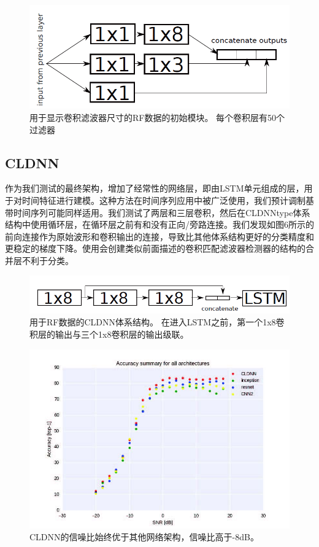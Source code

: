\begin{figure}[!h]
	\centering
	\includegraphics[scale=1]{figures/chapter_5/fig5}
	\caption{用于显示卷积滤波器尺寸的RF数据的初始模块。 每个卷积层有50个过滤器}
\end{figure}

\subsection{CLDNN}

作为我们测试的最终架构，增加了经常性的网络层，即由LSTM单元组成的层，用于对时间特征进行建模。这种方法在时间序列应用中被广泛使用，我们预计调制基带时间序列可能同样适用。我们测试了两层和三层卷积，然后在CLDNNtype体系结构中使用循环层，在循环层之前有和没有正向/旁路连接。我们发现如图6所示的前向连接作为原始波形和卷积输出的连接，导致比其他体系结构更好的分类精度和更稳定的梯度下降。使用会创建类似前面描述的卷积匹配滤波器检测器的结构的合并层不利于分类。\par
\begin{figure}[!h]
	\centering
	\includegraphics[scale=1]{figures/chapter_5/fig6}
	\caption{用于RF数据的CLDNN体系结构。 在进入LSTM之前，第一个1x8卷积层的输出与三个1x8卷积层的输出级联。}
\end{figure}

\begin{figure}[!h]
	\centering
	\includegraphics[scale=1]{figures/chapter_5/fig7}
	\caption{CLDNN的信噪比始终优于其他网络架构，信噪比高于-8dB。}
\end{figure}

